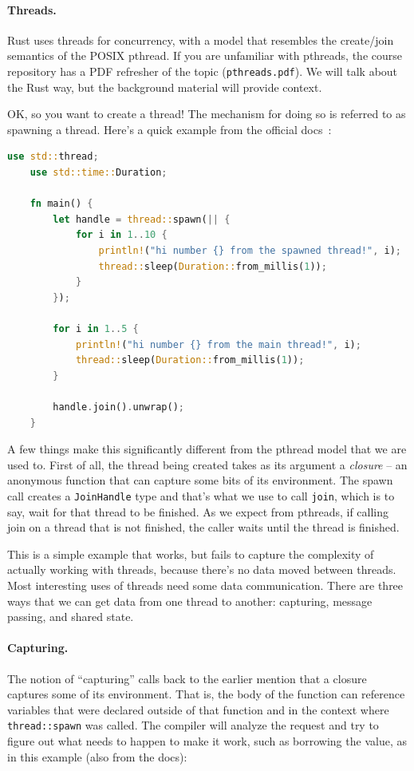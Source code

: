 \paragraph{Threads.} Rust uses threads for concurrency, with a model that resembles the create/join semantics of the POSIX pthread. If you are unfamiliar with pthreads, the course repository has a PDF refresher of the topic (\texttt{pthreads.pdf}). We will talk about the Rust way, but the background material will provide context.

OK, so you want to create a thread! The mechanism for doing so is referred to as spawning a thread. Here's a quick example from the official docs~\cite{rustdocs}:

\begin{lstlisting}[language=Rust]
    use std::thread;
    use std::time::Duration;

    fn main() {
        let handle = thread::spawn(|| {
            for i in 1..10 {
                println!("hi number {} from the spawned thread!", i);
                thread::sleep(Duration::from_millis(1));
            }
        });

        for i in 1..5 {
            println!("hi number {} from the main thread!", i);
            thread::sleep(Duration::from_millis(1));
        }

        handle.join().unwrap();
    }
\end{lstlisting}

A few things make this significantly different from the pthread model that we are used to. First of all, the thread being created takes as its argument a \textit{closure} -- an anonymous function that can capture some bits of its environment. The spawn call creates a \texttt{JoinHandle} type and that's what we use to call \texttt{join}, which is to say, wait for that thread to be finished. As we expect from pthreads, if calling join on a thread that is not finished, the caller waits until the thread is finished.

This is a simple example that works, but fails to capture the complexity of actually working with threads, because there's no data moved between threads. Most interesting uses of threads need some data communication. There are three ways that we can get data from one thread to another: capturing, message passing, and shared state.

\paragraph{Capturing.} 
The notion of ``capturing'' calls back to the earlier mention that a closure captures some of its environment. That is, the body of the function can reference variables that were declared outside of that function and in the context where \texttt{thread::spawn} was called. The compiler will analyze the request and try to figure out what needs to happen to make it work, such as borrowing the value, as in this example (also from the docs):

